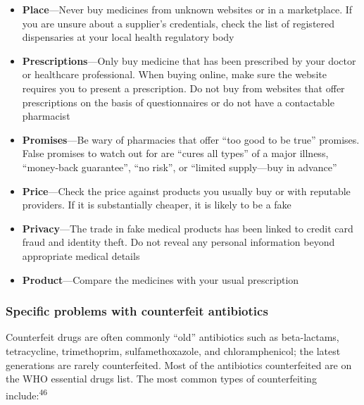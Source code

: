 \documentclass[
  11pt,
  paper=a4,
  ,captions=tableheading
]{scrartcl}
\providecommand{\tightlist}{%
  \setlength{\itemsep}{0pt}\setlength{\parskip}{0pt}}
\begin{document}
\begin{itemize}
\tightlist
\item
  \textbf{Place}---Never buy medicines from unknown websites or in a
  marketplace. If you are unsure about a supplier's credentials, check
  the list of registered dispensaries at your local health regulatory
  body
\item
  \textbf{Prescriptions}---Only buy medicine that has been prescribed by
  your doctor or healthcare professional. When buying online, make sure
  the website requires you to present a prescription. Do not buy from
  websites that offer prescriptions on the basis of questionnaires or do
  not have a contactable pharmacist
\item
  \textbf{Promises}---Be wary of pharmacies that offer ``too good to be
  true'' promises. False promises to watch out for are ``cures all
  types'' of a major illness, ``money-back guarantee'', ``no risk'', or
  ``limited supply---buy in advance''
\item
  \textbf{Price}---Check the price against products you usually buy or
  with reputable providers. If it is substantially cheaper, it is likely
  to be a fake
\item
  \textbf{Privacy}---The trade in fake medical products has been linked
  to credit card fraud and identity theft. Do not reveal any personal
  information beyond appropriate medical details
\item
  \textbf{Product}---Compare the medicines with your usual prescription
\end{itemize}

\hypertarget{specific-problems-with-counterfeit-antibiotics}{%
\subsubsection*{Specific problems with counterfeit
antibiotics}\label{specific-problems-with-counterfeit-antibiotics}}

Counterfeit drugs are often commonly ``old'' antibiotics such as
beta-lactams, tetracycline, trimethoprim, sulfamethoxazole, and
chloramphenicol; the latest generations are rarely counterfeited. Most
of the antibiotics counterfeited are on the WHO essential drugs list.
The most common types of counterfeiting include:\textsuperscript{46}
\end{document}
